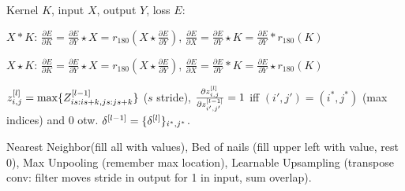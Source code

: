 

\begin{definition}[Backprop]
    Kernel \(K\), input \(X\), output \(Y\), loss \(E\):

    \(X \ast K\): \(\frac{\partial E}{\partial K} = \frac{\partial E}{\partial Y} \star X = r_{180}(X \star \frac{\partial E}{\partial Y})\), \(\frac{\partial E}{\partial X} = \frac{\partial E}{\partial Y} \star K = \frac{\partial E}{\partial Y} \ast r_{180}(K) \)

    \(X \star K\): \(\frac{\partial E}{\partial K} = \frac{\partial E}{\partial Y} \star X = r_{180}(X \star \frac{\partial E}{\partial Y})\), \(\frac{\partial E}{\partial X} = \frac{\partial E}{\partial Y} \ast K = \frac{\partial E}{\partial Y} \star r_{180}(K)\)
\end{definition}

\begin{definition}
    \(z_{i, j}^{[l]} = \max\{Z_{is:is+k, js:js+k}^{[l-1]}\}\) (\(s\) stride), \(\frac{\partial z_{i, j}^{[l]}}{\partial z_{i', j'} ^{[l-1]}} = 1\) iff \((i',j') = (i^*, j^*)\) (max indices) and 0 otw. \(\delta^{[l-1]} = \{\delta^{[l]}\}_{i^*, j^*}\).
\end{definition}

\begin{definition}[Upsampling]
    Nearest Neighbor(fill all with values), Bed of nails (fill upper left with value, rest 0), Max Unpooling (remember max location), Learnable Upsampling (transpose conv: filter moves stride in output for 1 in input, sum overlap).
\end{definition}

